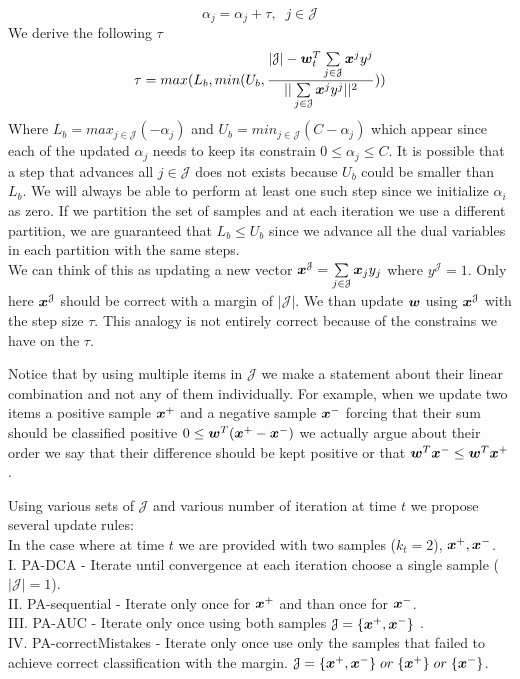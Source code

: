 \[ \alpha_j = \alpha_j + \tau , \;\; j \in \mathcal{J} \]
We derive the following $\tau$
\[ \tau = max(L_b   , min(U_b , \frac{|\mathcal{J}| - \bm{w}_t^T \sum\limits_{j \in \mathcal{J}} {\bm{x}^j y^j}   }{|| \sum\limits_{j \in \mathcal{J} }{\bm{x}^j y^j} ||^2 }  ) )
\]
Where $ L_b = max_{ j \in \mathcal{J} } (-\alpha_j) $ and $ U_b = min_{ j \in \mathcal{J} } (C -\alpha_j) $ which appear since each of the updated $\alpha_j$ needs to keep its constrain $0 \leq \alpha_j \leq C $.
It is possible that a step that advances all $j \in \mathcal{J} $ does not exists because $ U_b $ could be smaller than $L_b$. We will always be able to perform at least one such step since we initialize $\alpha_i$ as zero. If we partition the set of samples and at each iteration we use a different partition, we are guaranteed that $L_b \leq U_b $ since we advance all the dual variables in each partition with the same steps.\\



We can think of this as updating a new vector $\bm{x}^\mathcal{J} = \sum\limits_{j \in \mathcal{J} }{\bm{x}_j y_j}$ where $y^\mathcal{J} = 1 $. Only here $\bm{x}^\mathcal{J}$ should be correct with a margin of $|\mathcal{J}| $.  We than update $\bm{w}$ using $\bm{x}^\mathcal{J}$ with the step size $\tau$. This analogy is not entirely correct because of the constrains we have on the $\tau$.


Notice that by using multiple items in $\mathcal{J}$ we make a statement about their linear combination and not any of them individually. For example, when we update two items a positive sample $\bm{x}^+$ and a negative sample $\bm{x}^-$ forcing that their sum should be classified positive $0 \leq \bm{w}^T (\bm{x}^+ - \bm{x}^-) $ we actually argue about their order we say that their difference should be kept positive or that $ \bm{w}^T \bm{x}^- \leq \bm{w}^T \bm{x}^+$.


Using various sets of $ \mathcal{J} $ and various number of iteration at time $t$ we propose several update rules:\\

In the case where at time $t$ we are provided with two samples ($k_t=2$), $\bm{x}^+, \bm{x}^-$.\\
I. PA-DCA - Iterate until convergence at each iteration choose a single sample ($|\mathcal{J}|=1$).\\
II. PA-sequential - Iterate only once for $\bm{x}^+$ and than once for $\bm{x}^-$.\\
III. PA-AUC - Iterate only once using both samples $\mathcal{J} = \{\bm{x}^+, \bm{x}^-\} $ .\\
IV. PA-correctMistakes - Iterate only once use only the samples that failed to achieve correct classification with the margin. $\mathcal{J} = \{\bm{x}^+, \bm{x}^-\} \; or \;\{\bm{x}^+ \} \; or \; \{ \bm{x}^- \}$.\\

